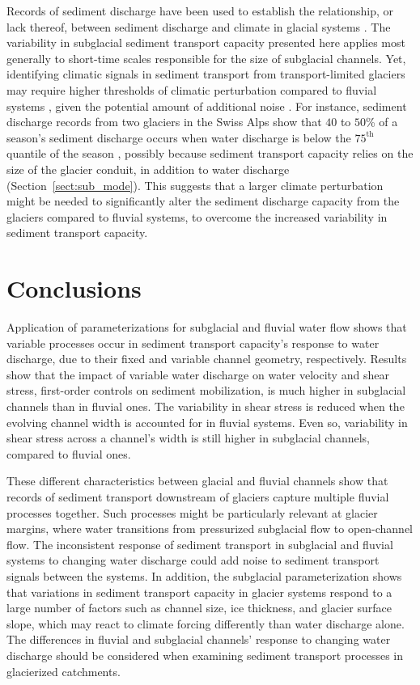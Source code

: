 \documentclass[11pt]{article}
\begin{document}
\begin{spacing}{1}
  Records of sediment discharge have been used to establish the relationship, or lack thereof, between sediment discharge and climate in glacial systems \citep[e.g.][]{koppes2009a,willenbring2016,mariotti2021}.
  The variability in subglacial sediment transport capacity presented here applies most generally to short-time scales responsible for the size of subglacial channels.
  Yet, identifying climatic signals in sediment transport from transport-limited glaciers may require higher thresholds of climatic perturbation compared to fluvial systems \citep{tofelde2021}, given the potential amount of additional noise \citep{castletort2003,jerolmack2010,romans2016}.
  For instance, sediment discharge records from two glaciers in the Swiss Alps show that $40$ to $50$\% of a season's sediment discharge occurs when water discharge is below the $75^{\mathrm{th}}$ quantile of the season \citep{delaney2018}, possibly because sediment transport capacity relies on the size of the glacier conduit, in addition to water discharge (Section~\ref{sect:sub_mode}).
  This suggests that a larger climate perturbation might be needed to significantly alter the sediment discharge capacity from the glaciers compared to fluvial systems, to overcome the increased variability in sediment transport capacity.


  \section{Conclusions}
  
  Application of parameterizations for subglacial and fluvial water flow shows that variable processes occur in sediment transport capacity's response to water discharge, due to their fixed and variable channel geometry, respectively.
  Results show that the impact of variable water discharge on water velocity and shear stress, first-order controls on sediment mobilization, is much higher in subglacial channels than in fluvial ones.
  The variability in shear stress is reduced when the evolving channel width is accounted for in fluvial systems.
  Even so, variability in shear stress across a channel's width is still higher in subglacial channels, compared to fluvial ones.
  
  These different characteristics between glacial and fluvial channels show that records of sediment transport downstream of glaciers capture multiple fluvial processes together.
  Such processes might be particularly relevant at glacier margins, where water transitions from pressurized subglacial flow to open-channel flow.
  The inconsistent response of sediment transport in subglacial and fluvial systems to changing water discharge could add noise to sediment transport signals between the systems.
  In addition, the subglacial parameterization shows that variations in sediment transport capacity in glacier systems respond to a large number of factors such as channel size, ice thickness, and glacier surface slope, which may react to climate forcing differently than water discharge alone. 
  The differences in fluvial and subglacial channels' response to changing water discharge should be considered when examining sediment transport processes in glacierized catchments.
  

\end{spacing}
\end{document}
